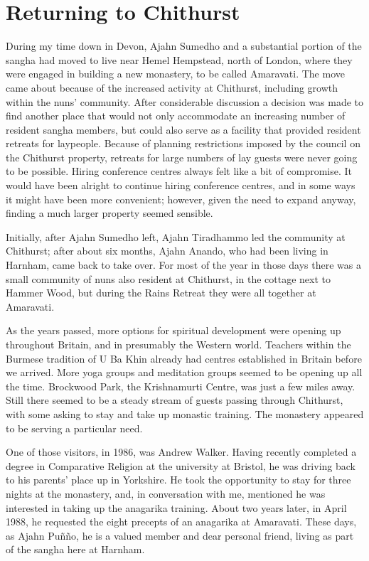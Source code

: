 \chapter{Returning to Chithurst}

During my time down in Devon, Ajahn Sumedho and a substantial portion of
the sangha had moved to live near Hemel Hempstead, north of London,
where they were engaged in building a new monastery, to be called
Amaravati\cite{amaravati}. The move came about because of the
increased activity at Chithurst,
including growth within the nuns' community. After considerable
discussion a decision was made to find another place that would not only
accommodate an increasing number of resident sangha members, but could
also serve as a facility that provided resident retreats for laypeople.
Because of planning restrictions imposed by the council on the Chithurst
property, retreats for large numbers of lay guests were never going to
be possible. Hiring conference centres always felt like a bit of
compromise. It would have been alright to continue hiring conference
centres, and in some ways it might have been more convenient; however,
given the need to expand anyway, finding a much larger property seemed
sensible.

Initially, after Ajahn Sumedho left, Ajahn Tiradhammo led the community
at Chithurst; after about six months, Ajahn Anando, who had been living
in Harnham, came back to take over. For most of the year in those days
there was a small community of nuns also resident at Chithurst, in the
cottage next to Hammer Wood, but during the Rains Retreat they were all
together at Amaravati.

As the years passed, more options for spiritual development were opening
up throughout Britain, and in presumably the Western world. Teachers
within the Burmese tradition of U Ba Khin already had centres
established in Britain before we arrived. More yoga groups and
meditation groups seemed to be opening up all the time. Brockwood Park,
the Krishnamurti Centre, was just a few miles away. Still there seemed
to be a steady stream of guests passing through Chithurst, with some
asking to stay and take up monastic training. The monastery appeared to
be serving a particular need.

One of those visitors, in 1986, was Andrew Walker. Having recently
completed a degree in Comparative Religion at the university at Bristol,
he was driving back to his parents' place up in Yorkshire. He took the
opportunity to stay for three nights at the monastery, and, in
conversation with me, mentioned he was interested in taking up the
anagarika training. About two years later, in April 1988, he requested
the eight precepts of an anagarika at Amaravati. These days, as Ajahn
Puñño, he is a valued member and dear personal friend, living as part of
the sangha here at Harnham.


